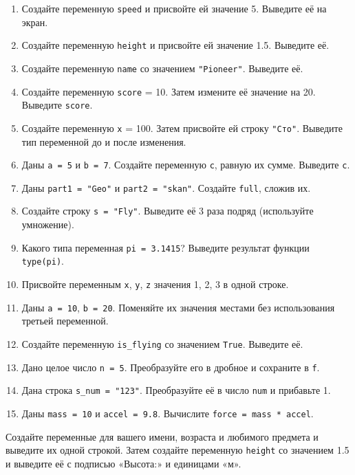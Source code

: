 \begin{enumerate}
    \item Создайте переменную \texttt{speed} и присвойте ей значение 5. Выведите её на экран.
    \item Создайте переменную \texttt{height} и присвойте ей значение 1.5. Выведите её.
    \item Создайте переменную \texttt{name} со значением \texttt{"Pioneer"}. Выведите её.
    \item Создайте переменную \texttt{score} = 10. Затем измените её значение на 20. Выведите \texttt{score}.
    \item Создайте переменную \texttt{x} = 100. Затем присвойте ей строку \texttt{"Сто"}. Выведите тип переменной до и после изменения.
    \item Даны \texttt{a = 5} и \texttt{b = 7}. Создайте переменную \texttt{c}, равную их сумме. Выведите \texttt{c}.
    \item Даны \texttt{part1 = "Geo"} и \texttt{part2 = "skan"}. Создайте \texttt{full}, сложив их.
    \item Создайте строку \texttt{s = "Fly"}. Выведите её 3 раза подряд (используйте умножение).
    \item Какого типа переменная \texttt{pi = 3.1415}? Выведите результат функции \texttt{type(pi)}.
    \item Присвойте переменным \texttt{x}, \texttt{y}, \texttt{z} значения 1, 2, 3 в одной строке.
    \item Даны \texttt{a = 10}, \texttt{b = 20}. Поменяйте их значения местами без использования третьей переменной.
    \item Создайте переменную \texttt{is\_flying} со значением \texttt{True}. Выведите её.
    \item Дано целое число \texttt{n = 5}. Преобразуйте его в дробное и сохраните в \texttt{f}.
    \item Дана строка \texttt{s\_num = "123"}. Преобразуйте её в число \texttt{num} и прибавьте 1.
    \item Даны \texttt{mass = 10} и \texttt{accel = 9.8}. Вычислите \texttt{force = mass * accel}.
\end{enumerate}

\begin{taskbox}
Создайте переменные для вашего имени, возраста и любимого предмета и выведите их одной строкой. Затем создайте переменную \texttt{height} со значением 1.5 и выведите её с подписью «Высота:» и единицами «м».
\end{taskbox}
